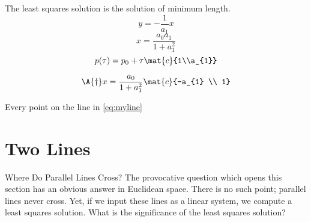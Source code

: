 The least squares solution is the solution of minimum length.
  \begin{equation*}   %
      y = -\frac{1}{a_{1}} x
  \end{equation*}
    \begin{equation*}   %
      x = \frac{a_{0} a_{1}} {1 + a_{1}^{2}}
  \end{equation*}
  \begin{equation*}   %
      p(\tau) = p_{0} + \tau \mat{c}{1\\a_{1}}
  \end{equation*}

  \begin{equation*}   %
      \A{\dagger} x = \frac{a_{0}}{1+a_{1}^2} \mat{c}{-a_{1} \\ 1}
  \end{equation*}

Every point on the line in \eqref{eq:myline}

\section{Two Lines}  %
Where Do Parallel Lines Cross? The provocative question which opens this section has an obvious answer in Euclidean space. There is no such point; parallel lines never cross. Yet, if we input these lines as a linear system, we compute a least squares solution. What is the significance of the least squares solution?

